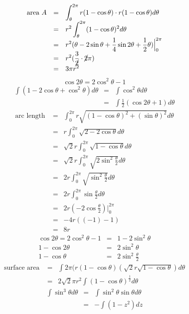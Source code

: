 \begin{eg}
\[\begin{array}{rcl}
\text{area } A & = & \displaystyle \int^{2\pi}_{\theta} r(1 - \cos \theta) \cdot r(1 - \cos \theta)d\theta\\
& = & \displaystyle r^2 \int^{2\pi}_{\theta} (1 - \cos \theta)^2 d\theta\\
& = & \displaystyle r^2 (\theta - 2 \sin \theta + \frac{1}{4} \sin 2\theta + \frac{1}{2} \theta) \Big |^{2\pi}_0\\
& = & \displaystyle r^2 (\frac{3}{\cancel{2}} \cdot \cancel{2}\pi)\\
& = & 3 \pi r^2
\end{array}\]
\[\cos 2 \theta = 2 \cos^2 \theta -1\]
\[\begin{array}{rcl}
\displaystyle \int (1 - 2 \cos \theta + \cos^2 \theta) d\theta & = & \displaystyle \int \cos^2 \theta d\theta\\
& = & \displaystyle \int \frac{1}{2} (\cos 2 \theta+1) d\theta
\end{array}\]
\[\begin{array}{rcl}
\text{arc length } & = & \displaystyle \int^{2 \pi}_0 r \sqrt{(1 - \cos \theta)^2 + (\sin \theta)^2} d \theta\\
& = & \displaystyle r \int^{2\pi}_0 \sqrt{2 - 2\cos \theta} d\theta\\
& = & \displaystyle \sqrt{2}r \int^{2\pi}_0 \sqrt{1 - \cos \theta} d\theta\\
& = & \displaystyle \sqrt{2}r \int^{2\pi}_0 \sqrt{2\sin^2 \frac{\theta}{2}} d\theta\\
& = & \displaystyle 2r \int^{2\pi}_0 \sqrt{\sin^2 \frac{\theta}{2}} d\theta\\
& = & \displaystyle 2r \int^{2\pi}_0 \sin \frac{\theta}{2} d\theta\\
& = & \displaystyle 2r(-2\cos \frac{\theta}{2}) \Big|^{2\pi}_0\\
& = & -4r((-1)-1)\\
& = & 8r
\end{array}\]
\[\begin{array}{rcl}
\cos 2\theta = 2\cos^2 \theta - 1 & = & 1 - 2 \sin^2 \theta\\
1 - \cos 2\theta & = & 2 \sin^2 \theta\\
1 - \cos \theta & = & \displaystyle 2 \sin^2 \frac{\theta}{2}
\end{array}\]
\[\begin{array}{rcl}
\text{surface area } & = & \displaystyle \int 2\pi (r(1 - \cos \theta)(\sqrt{2}r \sqrt{1 - \cos \theta}) d\theta\\
& = & \displaystyle 2 \sqrt{2} \pi r^2 \int (1 - \cos \theta)^{\frac{1}{2}} d\theta
\end{array}\]
\[\begin{array}{rcl}
\displaystyle \int \sin^3 \theta d\theta & = & \displaystyle \int \sin^2 \theta \sin \theta d\theta\\
& = & \displaystyle - \int (1 - z^2) dz
\end{array}\]
\end{eg}
